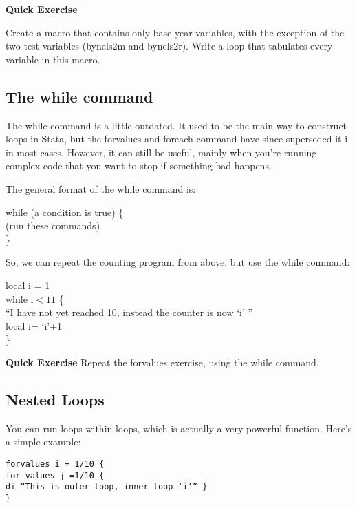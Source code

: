\documentclass[10pt]{article}
\begin{document}
\textbf{Quick Exercise}

Create a macro that contains only base year variables, with the
exception of the two test variables (bynels2m and bynels2r). Write a loop
that tabulates every variable in this macro. 

\subsection{The while command}

The while command is a little outdated. It used to be the main way to
construct loops in Stata, but the forvalues and foreach command have
since superseded it i in most cases. However, it can still be useful,
mainly when you're running complex code that you want to stop if
something bad happens. 

The general format of the while command is:

\begin{texttt}
  while (a condition is true) \{\\
(run these commands)\\
\} \\
\end{texttt}

So, we can repeat the counting program from above, but use the while
command:

\begin{texttt}
local i = 1 \\
  while i$<11$ \{ \\
  ``I have not yet reached 10, instead the counter is now `i' '' \\
   local i= `i'+1 \\
\}
\end{texttt}

\textbf{Quick Exercise}
Repeat the forvalues exercise, using the while command. 

\subsection{Nested Loops}

You can run loops within loops, which is actually a very powerful
function. Here's a simple example:

\texttt{forvalues i = 1/10 \{\\
          for values j =1/10 \{\\ 
        di ``This is outer loop, inner loop `i'''
        \} \\
        \} \\
         }
\end{document}
